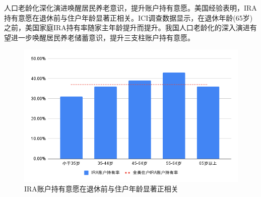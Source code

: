 \documentclass[a4paper,10.5pt]{ctexart}
\begin{document}
人口老龄化深化演进唤醒居民养老意识，提升账户持有意愿。美国经验表明，IRA持有意愿在退休前与住户年龄显著正相关。ICI调查数据显示，在退休年龄(65岁)之前，美国家庭IRA持有率随家主年龄提升而提升。我国人口老龄化的深入演进有望进一步唤醒居民养老储蓄意识，提升三支柱账户持有意愿。
\begin{figure}[H]
    \includegraphics[width=\linewidth]{img/IRA账户持有率和全美住户IRA账户持有率.png}
    \caption{IRA账户持有意愿在退休前与住户年龄显著正相关}
\end{figure}
\end{document}
